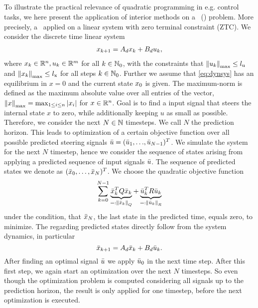 \subsection{\mpclong}
To illustrate the practical relevance of quadratic programming in e.g. control tasks, we here present the application of interior methods on a \mpclong \ (\mpc) problem. More precisely, a \mpc \ applied on a linear system with zero terminal constraint (ZTC).
We consider the discrete time linear system
\begin{align}
x_{k+1} = A_d x_k + B_d u_k, \label{eq:dynsys}
\end{align}
where $ x_k \in \mathbb{R}^n, u_k \in \mathbb{R}^m $ for all $ k \in  \mathbb{N}_0$, with the constraints that $ {\left\lVert u_k\right\rVert}_{\mathrm{max}} \leq {l}_{\mathrm{u}}$
and $ {\left\lVert x_k\right\rVert}_{\mathrm{max}} \leq {l}_{\mathrm{x}} $ for all steps $ k\in \mathbb{N}_0 $. Further we assume that \eqref{eq:dynsys} has an equilibrium in $ x = 0 $ and the current state $ x_0 $ is given. The maximum-norm is defined as the maximum absolute value over all entries of the vector, ${\left\lVert x\right\rVert}_{\mathrm{max}} = \max_{1\leq i\leq n } |x_i| $ for $ x\in \mathbb{R}^n $.
Goal is to find a input signal that steers the internal state $ x $ to zero, while additionally keeping $ u $ as small as possible. Therefore, we consider the next $ N \in \mathbb{N} $ timesteps. We call $ N $ the prediction horizon.
This leads to optimization of a certain objective function over all possible predicted steering signals $ \bar{u} = ({\bar{u}_1},{\dots},{\bar{u}_{N-1}})^T $. We simulate the system for the next $ N $ timestep, hence we consider the sequence of states arising from applying a predicted sequence of input signals $ \bar{u} $. The sequence of predicted states we denote as $ (\bar{x}_0,\dots,\bar{x}_N)^T $.
We choose the quadratic objective function
\begin{equation}
\sum_{k = 0}^{N-1} \underbrace{\bar{x}_k^T Q \bar{x}_k }_{=: \left\lVert\bar{x}_k\right\rVert_Q}+ \underbrace{\bar{u}_k ^T R \bar{u}_k}_{=:\left\lVert\bar{u}_k\right\rVert_R} \label{eq:mpcobjraw}
\end{equation}
under the condition, that $ \bar{x}_N $, the last state in the predicted time, equals zero,
to minimize. The regarding predicted states directly follow from the system dynamics, in particular
\[ \bar{x}_{k+1} = A_d \bar{x}_k + B_d \bar{u}_k. \] After finding an optimal signal $ \bar{u} $ we apply $ \bar{u}_0 $ in the next time step. After this first step, we again start an optimization over the next $ N $ timesteps. So even though the optimization problem is computed considering all signals up to the prediction horizon, the result is only applied for one timestep, before the next optimization is executed.

